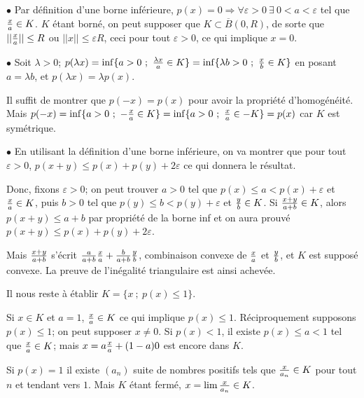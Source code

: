 {\begin{enumerate}
{$\bullet$ Par définition d'une borne inférieure, $p(x)=0\Longrightarrow
\forall\varepsilon>0 \ \exists\ 0<a< \varepsilon$ tel que ${x\over a}\in K$. $K$
étant borné, on peut supposer que $K\subset \overline B(0,R)$, de sorte que
$||{x\over a}||\leq R$ ou $||x||\leq \varepsilon R$, ceci pour tout
$\varepsilon>0$, ce qui implique $x=0$.

\smallskip 
 
$\bullet$ Soit $\lambda>0$; $p(\lambda x)=
\inf\{a>0\ ;\ {\lambda x\over a}\in K\}=\inf\{\lambda b>0\ ;\ {x\over
b}\in K\}$ en posant $a=\lambda b$, et $p(\lambda x)=\lambda p(x)$.

Il suffit de montrer que $p(- x)=p(x)$ pour avoir la propriété d'homogénéité.
Mais 
$p(- x)=\inf\{a>0\ ;\ -{ x\over a}\in K\}=\inf\{a>0\ ;\ { x\over a}\in
-K\}=p(x)$ car $K$ est symétrique.

\smallskip

$\bullet$ En utilisant la définition d'une borne inférieure, on va montrer que
pour tout
$\varepsilon>0$,
$p(x+y)\leq p(x)+p(y)+2\varepsilon$ ce qui donnera le résultat.

Donc, fixons $\varepsilon>0$; on peut trouver $a>0$ tel que $p(x)\leq
a<p(x)+\varepsilon$ et ${ x\over a}\in K$, puis $b>0$ tel que $p(y)\leq
b<p(y)+\varepsilon$ et ${y\over b}\in K$. Si ${ x+y\over a+b}\in K$, alors
$p(x+y)\leq a+b$ par propriété de la borne inf et on aura prouvé $p(x+y)\leq
p(x)+p(y)+2\varepsilon$.

Mais ${ x+y\over a+b}$ s'écrit ${ a\over a+b}{x\over a}+{
b\over a+b}{y\over b}$,  combinaison convexe de ${ x\over a}$ et ${ y\over b}$,
et $K$ est supposé convexe. La preuve de l'inégalité triangulaire est ainsi
achevée.

\smallskip

Il nous reste à établir $K=\{x\ ;\ p(x)\leq 1\}$. 

Si $x\in K$ et $a=1$, ${ x\over
a}\in K$ ce qui implique $p(x)\leq 1$. 
 Réciproquement supposons $ p(x)\leq 1$;
on peut supposer $x\not=0$. Si $p(x)<1$, il existe $p(x)\leq a<1$ tel que
${x\over a}\in K$; mais $x=a{x\over a}+(1-a)0$ est encore dans $K$.

Si $p(x)=1$ il existe $(a_n)$ suite de nombres positifs tels
que 
${x\over a_n}\in K$ pour tout $n$ et tendant vers $1$.  Mais $K$ étant fermé,
$x=\lim{x\over a_n}\in K$.}
\end{enumerate}
}
